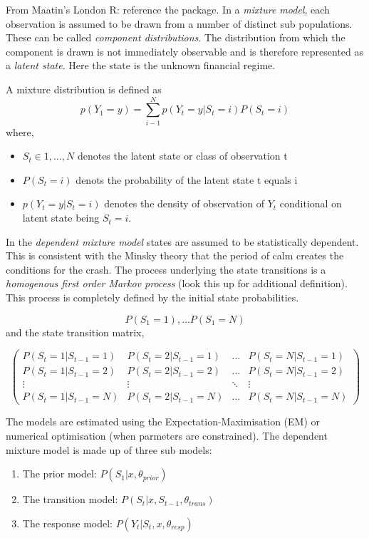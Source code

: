 \documentclass[12pt, a4paper, oneside]{article} %
\begin{document}
From Maatin's London R:  reference the package.  In a \emph{mixture model}, each observation is assumed to be drawn from a number of distinct sub populations.  These can be called \emph{component distributions}.  The distribution from which the component is drawn is not immediately observable and is therefore represented as a \emph{latent state}.  Here the state is the unknown financial regime.  

A mixture distribution is defined as 
\begin{equation}
p(Y_1 = y) = \sum_{i - 1}^N p(Y_t = y|S_t = i)P(S_t = i)
\end{equation}
where,
\begin{itemize}
\item $S_t \in {1, \dots, N}$ denotes the latent state or class of observation t
\item $P(S_t = i)$ denots the probability of the latent state t equals i 
\item $p(Y_t = y|S_t = i)$ denotes the density of observation of $Y_t$ conditional on latent state being $S_t = i$.
\end{itemize}

In the \emph{dependent mixture model} states are assumed to be statistically dependent.  This is consistent with the Minsky theory that the period of calm creates the conditions for the crash. The process underlying the state transitions is a \emph{homogenous first order Markov process}  (look this up for additional definition).  This process is completely defined by the initial state probabilities.  

\begin{equation*}
P(S_1 = 1), \dots P(S_1 = N)
\end{equation*}
and the state transition matrix, 

\begin{equation*}
\begin{pmatrix}
P(S_t = 1|S_{t-1}=1) & P(S_t = 2|S_{t-1}=1) & \dots & P(S_t = N|S_{t-1}=1)\\
P(S_t = 1|S_{t-1}=2) & P(S_t = 2|S_{t-1}=2) & \dots & P(S_t = N|S_{t-1}=2)\\
\vdots & \vdots & \ddots & \vdots \\
P(S_t = 1|S_{t-1}=N) & P(S_t = 2|S_{t-1}=N) & \dots & P(S_t = N|S_{t-1}=N)
\end{pmatrix}
\end{equation*}

The models are estimated using the Expectation-Maximisation (EM) or numerical optimisation (when parmeters are constrained).  The dependent mixture model is made up of three sub models:  
\begin{enumerate}
\item The prior model: $P(S_1|x, \theta_{prior})$
\item The transition model: $P(S_t|x, S_{t-1}, \theta_{trans})$
\item The response model: $P(Y_t| S_t, x, \theta_{resp})$
\end{enumerate}
 
\end{document}
